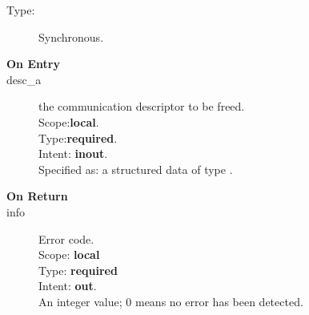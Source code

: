 %
%


\begin{description}
\item[Type:] Synchronous.
\item[\bf On Entry]
\item[desc\_a] the communication descriptor to be freed.\\
Scope:{\bf local}.\\
Type:{\bf required}.\\
Intent: {\bf inout}.\\
Specified as: a structured data of type \descdata.
\end{description}

\begin{description}
\item[\bf On Return]
\item[info] Error code.\\
Scope: {\bf local} \\
Type: {\bf required} \\
Intent: {\bf out}.\\
An integer value; 0 means no error has been detected. 
\end{description}



%
%


